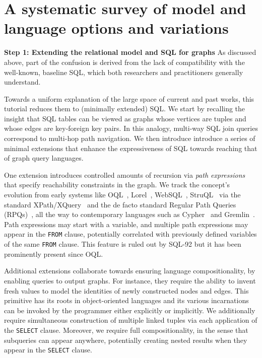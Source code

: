 \section{A systematic survey of model and language options and variations}

\noindent \textbf{Step 1: Extending the relational model and SQL for graphs} As discussed above, part of the confusion is derived from the lack of compatibility with the well-known, baseline SQL, which both researchers and practitioners generally understand.

Towards a uniform explanation of the large space of current and past works, this tutorial reduces them to (minimally extended) SQL.
We start by recalling the insight that SQL tables can be viewed as graphs whose
vertices are tuples and whose edges are key-foreign key pairs. In this analogy, multi-way SQL join queries correspond to multi-hop path navigation.
We then introduce introduce a series of minimal extensions that enhance the expressiveness of SQL towards reaching that of graph query languages.

One extension introduces controlled amounts of recursion via {\em path expressions} that specify reachability constraints in the graph.
We track the concept's evolution from early systems like OQL~\cite{oql-dbpl-1989},
Lorel~\cite{lorel}, WebSQL~\cite{websql}, StruQL~\cite{struql} via the standard XPath/XQuery~\cite{XQuery}
and the de facto standard Regular Path Queries (RPQs)~\cite{crpqs}, all the way to
contemporary languages such as Cypher~\cite{cypher} and Gremlin~\cite{gremlin}.
Path expressions may start with a variable, and multiple path expressions may appear in the \texttt{FROM} clause, potentially
correlated with previously defined variables of the same \texttt{FROM} clause. This feature is ruled out by SQL-92 but it has been prominently present
since OQL.

Additional extensions collaborate towards ensuring language compositionality, by enabling queries to output graphs.
For instance, they require the ability to invent fresh values to model the identities of newly constructed nodes and edges. This primitive has
its roots in object-oriented languages and its various incarnations can be invoked by the programmer either explicitly or implicitly.
We additionally require simultaneous construction of multiple linked tuples via each application of the \texttt{SELECT} clause.
Moreover, we require full compositionality, in the sense that subqueries can appear anywhere, potentially creating nested results when they appear in the \texttt{SELECT} clause.

